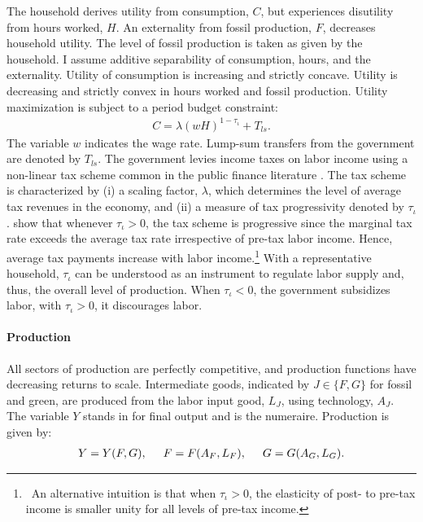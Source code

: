The household derives utility from consumption, $C$, but experiences disutility from hours worked, $H$. An externality from fossil production, $F$, decreases household utility. The level of fossil production is taken as given by the household.
I assume additive separability of consumption, hours, and the externality. Utility of consumption is increasing and strictly concave. Utility is decreasing and strictly convex in hours worked and fossil production.
Utility maximization is subject to a period budget constraint:
\begin{align}
	 C= \lambda(wH)^{1-\tau_{\iota}}+T_{ls}. \label{eq:hhbudget}
\end{align}
The variable $w$ indicates the wage rate.  Lump-sum transfers from the government are denoted by $T_{ls}$.
The government levies income taxes on labor income using a non-linear tax scheme common in the public finance literature \citep{Heathcote2017OptimalFramework, Benabou2002TaxEfficiency}. The tax scheme is
characterized by (i) a scaling factor, $\lambda$, which determines the level of average tax revenues in the economy, and (ii) a measure of tax progressivity denoted by $\tau_{\iota}$. 
\cite{Heathcote2017OptimalFramework} show that whenever $\tau_{\iota}>0$, the tax scheme is progressive since the marginal tax rate exceeds the average tax rate irrespective of  pre-tax labor income. Hence, average tax payments increase with labor income.\footnote{\ An alternative intuition is that when $\tau_{\iota}>0$, the elasticity of post- to pre-tax  income is smaller unity for all levels of pre-tax income.  } %
With a representative household, $\tau_{\iota}$ can be understood as an instrument to regulate labor supply and, thus, the overall level of production. When $\tau_{\iota}<0$, the government subsidizes labor, with $\tau_{\iota}>0$, it discourages labor. 

\paragraph{Production}
All sectors of production are perfectly competitive, and production functions have decreasing returns to scale. %
Intermediate goods, indicated by $J\in \{F,G\}$ for fossil and green, are produced from the labor input good, $L_J$, using technology, $A_J$. The variable $Y$ stands in for final output and is the numeraire. Production is given by:
\begin{align}
Y=Y(F, G), \hspace{5mm} F=F(A_F, L_F),\hspace{5mm} G=G(A_G, L_G). \label{eq:prod}
\end{align}

